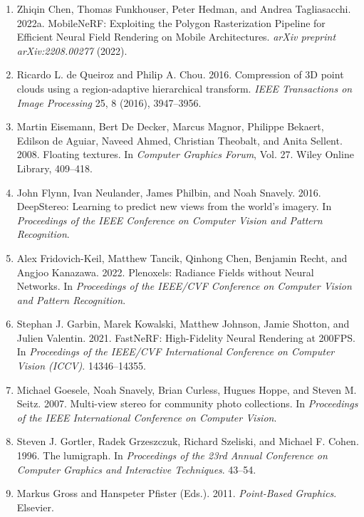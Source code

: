 \begin{enumerate}[leftmargin=2em, itemsep=0.3em, topsep=0.4em, parsep=0pt]
    \item Zhiqin Chen, Thomas Funkhouser, Peter Hedman, and Andrea Tagliasacchi. 2022a. MobileNeRF: Exploiting the Polygon Rasterization Pipeline for Efficient Neural Field Rendering on Mobile Architectures. \textit{arXiv preprint arXiv:2208.00277} (2022).

    \item Ricardo L. de Queiroz and Philip A. Chou. 2016. Compression of 3D point clouds using a region-adaptive hierarchical transform. \textit{IEEE Transactions on Image Processing} 25, 8 (2016), 3947--3956.

    \item Martin Eisemann, Bert De Decker, Marcus Magnor, Philippe Bekaert, Edilson de Aguiar, Naveed Ahmed, Christian Theobalt, and Anita Sellent. 2008. Floating textures. In \textit{Computer Graphics Forum}, Vol. 27. Wiley Online Library, 409--418.

    \item John Flynn, Ivan Neulander, James Philbin, and Noah Snavely. 2016. DeepStereo: Learning to predict new views from the world's imagery. In \textit{Proceedings of the IEEE Conference on Computer Vision and Pattern Recognition}.

    \item Alex Fridovich-Keil, Matthew Tancik, Qinhong Chen, Benjamin Recht, and Angjoo Kanazawa. 2022. Plenoxels: Radiance Fields without Neural Networks. In \textit{Proceedings of the IEEE/CVF Conference on Computer Vision and Pattern Recognition}.

    \item Stephan J. Garbin, Marek Kowalski, Matthew Johnson, Jamie Shotton, and Julien Valentin. 2021. FastNeRF: High-Fidelity Neural Rendering at 200FPS. In \textit{Proceedings of the IEEE/CVF International Conference on Computer Vision (ICCV)}. 14346--14355.

    \item Michael Goesele, Noah Snavely, Brian Curless, Hugues Hoppe, and Steven M. Seitz. 2007. Multi-view stereo for community photo collections. In \textit{Proceedings of the IEEE International Conference on Computer Vision}.

    \item Steven J. Gortler, Radek Grzeszczuk, Richard Szeliski, and Michael F. Cohen. 1996. The lumigraph. In \textit{Proceedings of the 23rd Annual Conference on Computer Graphics and Interactive Techniques}. 43--54.

    \item Markus Gross and Hanspeter Pfister (Eds.). 2011. \textit{Point-Based Graphics}. Elsevier.


\end{enumerate}
